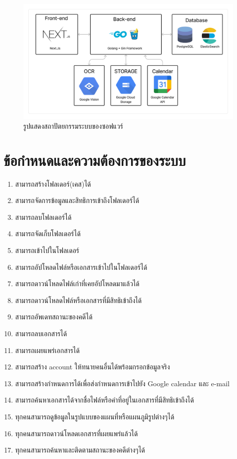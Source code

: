 \documentclass[12pt,oneside,openright,a4paper]{cpe-thai-project}
\begin{document}
\begin{figure}[!ht]\centering
  \includegraphics[width=13cm]{./assets/system-arch.png}
  \caption{รูปแสดงสถาปัตยกรรมระบบของซอฟแวร์}\label{fig:systemArch}
\end{figure}

\newpage

\section{ข้อกำหนดและความต้องการของระบบ}
\begin{enumerate}
  \item สามารถสร้างโฟลเดอร์(เคส)ได้
  \item สามารถจัดการข้อมูลและสิทธิการเข้าถึงโฟลเดอร์ได้
  \item สามารถลบโฟลเดอร์ได้
  \item สามารถจัดเก็บโฟลเดอร์ได้
  \item สามารถเข้าไปในโฟลเดอร์
  \item สามารถอัปโหลดไฟล์หรือเอกสารเข้าไปในโฟลเดอร์ได้
  \item สามารถดาวน์โหลดไฟล์เก่าที่เคยอัปโหลดมาแล้วได้
  \item สามารถดาวน์โหลดไฟล์หรือเอกสารที่มีสิทธิเข้าถึงได้
  \item สามารถอัพเดทสถานะของคดีได้
  \item สามารถลบเอกสารได้
  \item สามารถเผยแพร่เอกสารได้
  \item สามารถสร้าง account ให้ทนายคนอื่นได้พร้อมกรอกข้อมูลจริง
  \item สามารถสร้างกําหนดการได้เพื่อส่งกําหนดการเข้าไปยัง Google calendar และ  e-mail
  \item สามารถค้นหาเอกสารได้จากชื่อไฟล์หรือคําที่อยู่ในเอกสารที่มีสิทธิเข้าถึงได้
  \item ทุกคนสามารถดูข้อมูลในรูปแบบของแผนที่หรือแผนภูมิรูปต่างๆได้
  \item ทุกคนสามารถดาวน์โหลดเอกสารที่เผยแพร่แล้วได้
  \item ทุกคนสามารถค้นหาและติดตามสถานะของคดีต่างๆได้
\end{enumerate}
\end{document}
